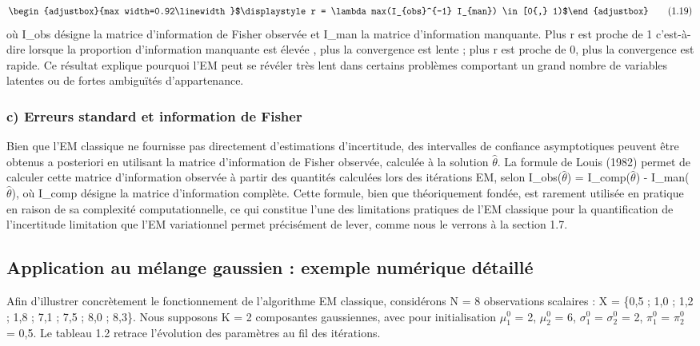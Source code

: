 \begin{equation}
\begin{adjustbox}{max width=0.92\linewidth}$\displaystyle r = \lambda max(I_{obs}^{-1} I_{man}) \in  [0{,} 1)$\end{adjustbox}
\tag{1.19}
\label{eq:1_19}
\end{equation}
où I\_obs désigne la matrice d'information de Fisher observée et I\_man la matrice d'information manquante. Plus r est proche de 1  c'est-à-dire lorsque la proportion d'information manquante est élevée , plus la convergence est lente ; plus r est proche de 0, plus la convergence est rapide. Ce résultat explique pourquoi l'EM peut se révéler très lent dans certains problèmes comportant un grand nombre de variables latentes ou de fortes ambiguïtés d'appartenance.

\subsubsection{c) Erreurs standard et information de Fisher}
Bien que l'EM classique ne fournisse pas directement d'estimations d'incertitude, des intervalles de confiance asymptotiques peuvent être obtenus a posteriori en utilisant la matrice d'information de Fisher observée, calculée à la solution $\hat{\theta }$. La formule de Louis (1982) permet de calculer cette matrice d'information observée à partir des quantités calculées lors des itérations EM, selon I\_obs($\hat{\theta }$) = I\_comp($\hat{\theta }$) - I\_man($\hat{\theta }$), où I\_comp désigne la matrice d'information complète. Cette formule, bien que théoriquement fondée, est rarement utilisée en pratique en raison de sa complexité computationnelle, ce qui constitue l'une des limitations pratiques de l'EM classique pour la quantification de l'incertitude  limitation que l'EM variationnel permet précisément de lever, comme nous le verrons à la section 1.7.

\subsection{Application au mélange gaussien : exemple numérique détaillé}
Afin d'illustrer concrètement le fonctionnement de l'algorithme EM classique, considérons N = 8 observations scalaires : X = \{0,5 ; 1,0 ; 1,2 ; 1,8 ; 7,1 ; 7,5 ; 8,0 ; 8,3\}. Nous supposons K = 2 composantes gaussiennes, avec pour initialisation $\mu _{1}^{0}$ = 2, $\mu _{2}^{0}$ = 6, $\sigma _{1}^{0}$ = $\sigma _{2}^{0}$ = 2, $\pi _{1}^{0}$ = $\pi _{2}^{0}$ = 0,5. Le tableau 1.2 retrace l'évolution des paramètres au fil des itérations.

